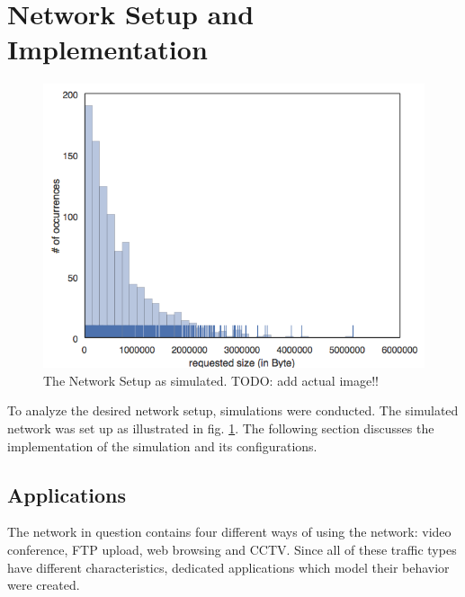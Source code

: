\documentclass[
10pt, %
a4paper, %
oneside, %
headinclude,footinclude, %
BCOR5mm, %
]{scrartcl}
\begin{document}
\section{Network Setup and Implementation}

\begin{figure}[!ht]
  \centering
  \includegraphics[width=\textwidth]{Figures/trace_plot.png}
  \caption{The Network Setup as simulated. TODO: add actual image!!} \label{fig:network}
\end{figure}

To analyze the desired network setup, simulations were conducted. The simulated network was set up as illustrated in fig. \ref{fig:network}. The following section discusses the implementation of the simulation and its configurations.

\subsection{Applications}
The network in question contains four different ways of using the network: video conference, FTP upload, web browsing and CCTV. Since all of these traffic types have different characteristics, dedicated applications which model their behavior were created.
\end{document}

